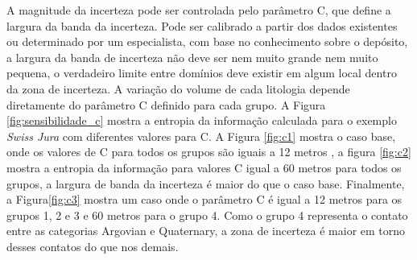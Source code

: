 A magnitude da incerteza pode ser controlada pelo parâmetro C, que define a largura da banda da incerteza. Pode ser calibrado a partir dos dados existentes ou determinado por um especialista, com base no conhecimento sobre o depósito, a largura da banda de incerteza não deve ser nem muito grande nem muito pequena, o verdadeiro limite entre domínios deve existir em algum local dentro da zona de incerteza. A variação do volume de cada litologia depende diretamente do parâmetro C definido para cada grupo. A Figura \autoref{fig:sensibilidade_c} mostra a entropia da informação calculada para o exemplo \textit{Swiss Jura} com diferentes valores para C. A Figura \autoref{fig:c1} mostra o caso base, onde os valores de C para todos os grupos são iguais a 12 metros , a figura \autoref{fig:c2} mostra a entropia da informação para valores C igual a 60 metros para todos os grupos, a largura de banda da incerteza é maior do que o caso base. Finalmente, a Figura\autoref{fig:c3} mostra um caso onde o parâmetro C é igual a 12 metros para os grupos 1, 2 e 3 e 60 metros para o grupo 4. Como o grupo 4 representa o contato entre as categorias Argovian e Quaternary, a zona de incerteza é maior em torno desses contatos do que nos demais.

